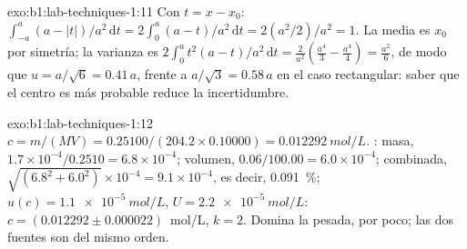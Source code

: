 \begin{solution}{exo:b1:lab-techniques-1:11}
Con $t = x - x_0$: $\int_{-a}^{a} (a - |t|)/a^2 \,\mathrm{d}t =
2 \int_0^a (a - t)/a^2 \,\mathrm{d}t = 2 (a^2/2)/a^2 = 1$. La media es
$x_0$ por simetría; la varianza es $2 \int_0^a t^2 (a - t)/a^2
\,\mathrm{d}t = \frac{2}{a^2}\left(\frac{a^4}{3} - \frac{a^4}{4}\right) =
\frac{a^2}{6}$, de modo que $u = a/\sqrt6 = 0.41\,a$, frente a
$a/\sqrt3 = 0.58\,a$ en el caso rectangular: saber que el centro es más
probable reduce la incertidumbre.
\end{solution}

\begin{solution}{exo:b1:lab-techniques-1:12}
$c = m/(MV) = 0.25100/(204.2 \times 0.10000) = \qty{0.012292}{mol/L}$.
: masa, $1.7 \times 10^{-4}/0.2510 = 6.8 \times
10^{-4}$; volumen, $0.06/100.00 = 6.0 \times 10^{-4}$; combinada,
$\sqrt{(6.8^2 + 6.0^2)} \times 10^{-4} = 9.1 \times 10^{-4}$, es decir,
\qty{0.091}{\percent}; $u(c) = \qty{1.1e-5}{mol/L}$, $U = \qty{2.2e-5}{mol/L}$:
$c = (0.012292 \pm 0.000022)$~mol/L, $k = 2$. Domina la pesada, por
poco; las dos fuentes son del mismo orden.
\end{solution}

